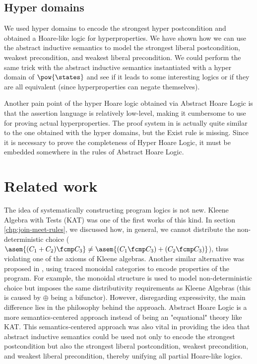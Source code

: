 \subsection{Hyper domains}
We used hyper domains to encode the strongest hyper postcondition and obtained
a Hoare-like logic for hyperproperties. We have shown how we can use the
abstract inductive semantics to model the strongest liberal postcondition,
weakest precondition, and weakest liberal precondition. We could perform the
same trick with the abstract inductive semantics instantiated with a hyper
domain of $\pow{\states}$ and see if it leads to some interesting logics or if
they are all equivalent (since hyperproperties can negate themselves).

Another pain point of the hyper Hoare logic obtained via Abstract Hoare Logic
is that the assertion language is relatively low-level, making it cumbersome to
use for proving actual hyperproperties. The proof system in \cite{Darnier2023}
is actually quite similar to the one obtained with the hyper domains, but the
Exist rule is missing. Since it is necessary to prove the completeness of Hyper
Hoare Logic, it must be embedded somewhere in the rules of Abstract Hoare
Logic.

\section{Related work}

The idea of systematically constructing program logics is not new. Kleene
Algebra with Tests (KAT) \cite{Kozen97} was one of the first works of this
kind. In section \ref{chp:join-meet-rules}, we discussed how, in general, we
cannot distribute the non-deterministic choice ($\asem{(C_1 + C_2) \fcmp C_3} \neq
\asem{(C_1 \fcmp C_3) + (C_2 \fcmp C_3)}$), thus violating one of the axioms of
Kleene algebras. Another similar alternative was proposed in \cite{Martin06},
using traced monoidal categories to encode properties of the program. For
example, the monoidal structure is used to model non-deterministic choice but
imposes the same distributivity requirements as Kleene Algebras (this is caused
by $\oplus$ being a bifunctor). However, disregarding expressivity, the main
difference lies in the philosophy behind the approach. Abstract Hoare Logic is
a more semantics-centered approach instead of being an "equational" theory like
KAT. This semantics-centered approach was also vital in providing the idea that
abstract inductive semantics could be used not only to encode the strongest
postcondition but also the strongest liberal postcondition, weakest
precondition, and weakest liberal precondition, thereby unifying all partial
Hoare-like logics.

